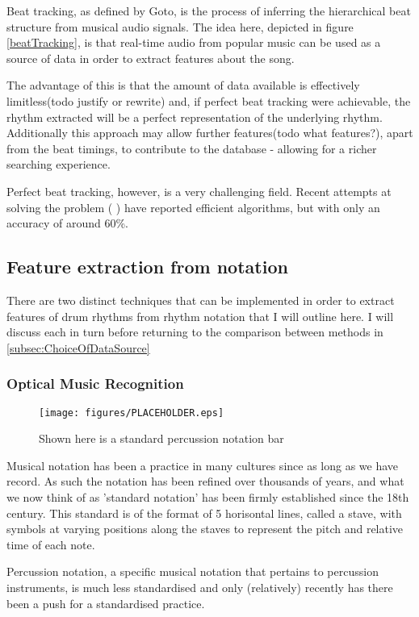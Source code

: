 \documentclass[12pt,twoside,notitlepage]{report}
\begin{document}
		Beat tracking, as defined by Goto\cite{Goto2001}, is the process of inferring the hierarchical beat structure from musical audio signals. The idea here, depicted in figure \ref{beatTracking}, is that real-time audio from popular music can be used as a source of data in order to extract features about the song. 
		
		The advantage of this is that the amount of data available is effectively limitless(todo justify or rewrite) and, if perfect beat tracking were achievable, the rhythm extracted will be a perfect representation of the underlying rhythm. Additionally this approach may allow further features(todo what features?), apart from the beat timings, to contribute to the database - allowing for a richer searching experience.
		
		Perfect beat tracking, however, is a very challenging field. Recent attempts at solving the problem (\cite{Ellis2007} \cite{EllisPoliner2007} \cite{DaviesPlumbley2007}) have reported efficient algorithms, but with only an accuracy of around 60\%.
		\subsection{Feature extraction from notation}
		There are two distinct techniques that can be implemented in order to extract features of drum rhythms from rhythm notation that I will outline here. I will discuss each in turn before returning to the comparison between methods in \ref{subsec:ChoiceOfDataSource}
			\subsubsection{Optical Music Recognition}
			\begin{figure}[h]
			\centerline{\texttt{[image: figures/PLACEHOLDER.eps]}}
			\caption{\label{PercussionNotation} Shown here is a standard percussion notation bar}
\end{figure}
		Musical notation has been a practice in many cultures since as long as we have record\cite{Scelta}. As such the notation has been refined over thousands of years, and what we now think of as 'standard notation' has been firmly established since the 18th century\cite{Scelta}. This standard is of the format of 5 horisontal lines, called a stave, with symbols at varying positions along the staves to represent the pitch and relative time of each note.
		
		Percussion notation, a specific musical notation that pertains to percussion instruments, is much less standardised and only (relatively) recently has there been a push for a standardised practice\cite{Weinberg1994}.
		
\end{document}
